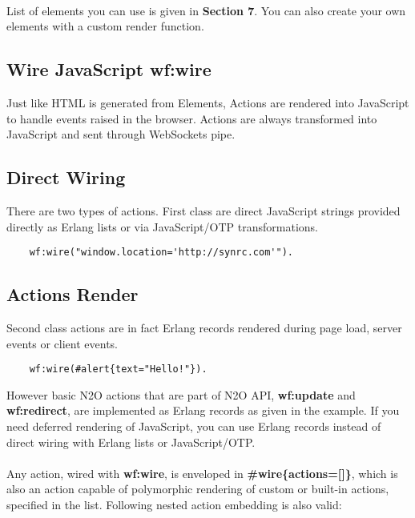 \paragraph{}
List of elements you can use is given in {\bf Section 7}. You can also create
your own elements with a custom render function.

\newpage
\subsection{Wire JavaScript \bf{wf:wire}}
Just like HTML is generated from Elements, Actions are rendered into
JavaScript to handle events raised in the browser. Actions are always
transformed into JavaScript and sent through WebSockets pipe.

\subsection*{Direct Wiring}
There are two types of actions. First class are direct JavaScript
strings provided directly as Erlang lists or via JavaScript/OTP
transformations.

\vspace{1\baselineskip}
\begin{lstlisting}
    wf:wire("window.location='http://synrc.com'").
\end{lstlisting}

\subsection*{Actions Render}
Second class actions are in fact Erlang records
rendered during page load, server events or client events.

\vspace{1\baselineskip}
\begin{lstlisting}
    wf:wire(#alert{text="Hello!"}).
\end{lstlisting}
\vspace{1\baselineskip}

However basic N2O actions that are part of N2O API, {\bf wf:update} and {\bf wf:redirect},
are implemented as Erlang records as given in the example. If you need deferred
rendering of JavaScript, you can use Erlang records instead of direct wiring with
Erlang lists or JavaScript/OTP.

\paragraph{}
Any action, wired with {\bf wf:wire}, is enveloped in {\bf \#wire\{actions=[]\}},
which is also an action capable of polymorphic rendering of custom or built-in actions, specified in the list.
Following nested action embedding is also valid:

